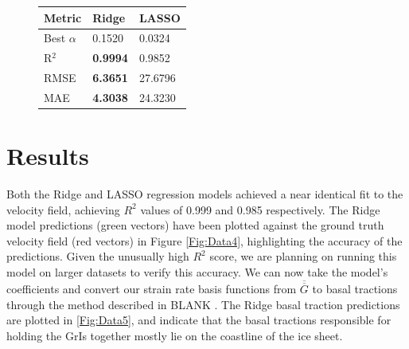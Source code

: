 \documentclass{article}
\begin{document}
\begin{figure}[!htb]
\begin{minipage}{0.33\textwidth}
   \end{minipage}
   \begin{minipage}{0.33\textwidth}
    \centering
     \begin{tabular}{l|l|l}
        \textbf{Metric} & \textbf{Ridge} & \textbf{LASSO} \\
        \hline
        Best $\alpha$ & 0.1520 & 0.0324 \\
        R$^{2}$ & \textbf{0.9994} & 0.9852 \\
        RMSE & \textbf{6.3651} & 27.6796 \\
        MAE & \textbf{4.3038} & 24.3230 \\
    \end{tabular}
    \subfloat[1c]
  \end{minipage}
\end{figure}

\section{Results}

Both the Ridge and LASSO regression models achieved a near identical fit to the velocity field, achieving $R^{2}$ values of 0.999 and 0.985 respectively. The Ridge model predictions (green vectors) have been plotted against the ground truth velocity field (red vectors) in Figure \ref{Fig:Data4}, highlighting the accuracy of the predictions. Given the unusually high $R^{2}$ score, we are planning on running this model on larger datasets to verify this accuracy. We can now take the model's coefficients and convert our strain rate basis functions from $\overline{\overline{G}}$ to basal tractions through the method described in  BLANK \cite{finzel_surface_2015}. The Ridge basal traction predictions are plotted in \ref{Fig:Data5}, and indicate that the basal tractions responsible for holding the GrIs together mostly lie on the coastline of the ice sheet.

\end{document}
